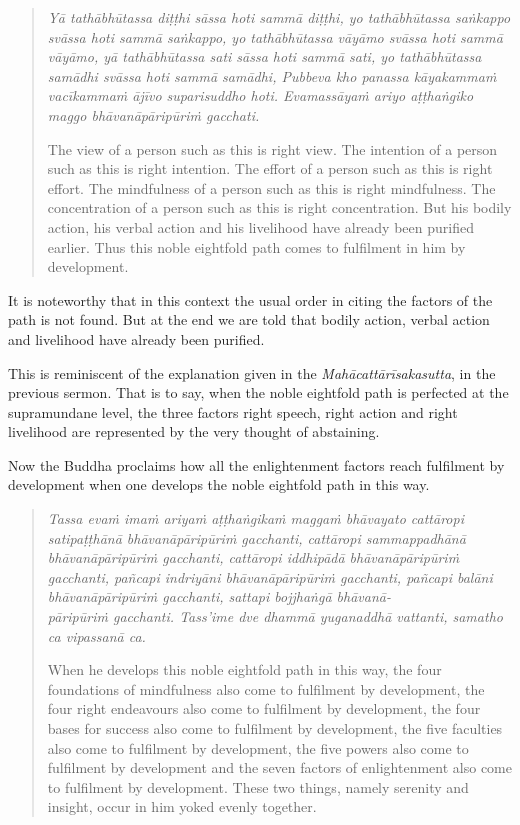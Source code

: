 \begin{quote}
\emph{Yā tathābhūtassa diṭṭhi sāssa hoti sammā diṭṭhi, yo tathābhūtassa saṅkappo svāssa hoti sammā saṅkappo, yo tathābhūtassa vāyāmo svāssa hoti sammā vāyāmo, yā tathābhūtassa sati sāssa hoti sammā sati, yo tathābhūtassa samādhi svāssa hoti sammā samādhi, Pubbeva kho panassa kāyakammaṁ vacīkammaṁ ājīvo suparisuddho hoti. Evamassāyaṁ ariyo aṭṭhaṅgiko maggo bhāvanāpāripūriṁ gacchati.}

The view of a person such as this is right view. The intention of a person such as this is right intention. The effort of a person such as this is right effort. The mindfulness of a person such as this is right mindfulness. The concentration of a person such as this is right concentration. But his bodily action, his verbal action and his livelihood have already been purified earlier. Thus this noble eightfold path comes to fulfilment in him by development.
\end{quote}

It is noteworthy that in this context the usual order in citing the factors of the path is not found. But at the end we are told that bodily action, verbal action and livelihood have already been purified.

This is reminiscent of the explanation given in the \emph{Mahācattārīsakasutta}, in the previous sermon. That is to say, when the noble eightfold path is perfected at the supramundane level, the three factors right speech, right action and right livelihood are represented by the very thought of abstaining.

Now the Buddha proclaims how all the enlightenment factors reach fulfilment by development when one develops the noble eightfold path in this way.

\begin{quote}
\emph{Tassa evaṁ imaṁ ariyaṁ aṭṭhaṅgikaṁ maggaṁ bhāvayato cattāropi satipaṭṭhānā bhāvanāpāripūriṁ gacchanti, cattāropi sammappadhānā bhāvanāpāripūriṁ gacchanti, cattāropi iddhipādā bhāvanāpāripūriṁ gacchanti, pañcapi indriyāni bhāvanāpāripūriṁ gacchanti, pañcapi balāni bhāvanāpāripūriṁ gacchanti, sattapi bojjhaṅgā bhāvanā-\\ pāripūriṁ gacchanti. Tass'ime dve dhammā yuganaddhā vattanti, samatho ca vipassanā ca.}

When he develops this noble eightfold path in this way, the four foundations of mindfulness also come to fulfilment by development, the four right endeavours also come to fulfilment by development, the four bases for success also come to fulfilment by development, the five faculties also come to fulfilment by development, the five powers also come to fulfilment by development and the seven factors of enlightenment also come to fulfilment by development. These two things, namely serenity and insight, occur in him yoked evenly together.
\end{quote}

